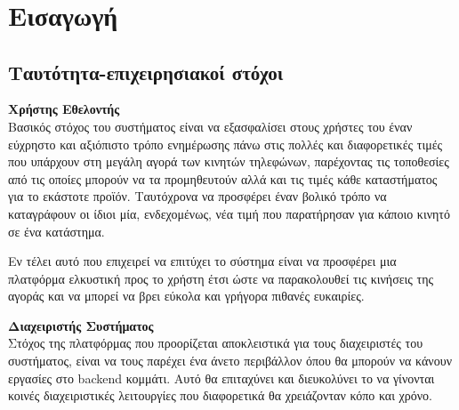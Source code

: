 \documentclass[12pt, oneside, a4paper]{report}
\begin{document}
\\
\\
\\
    \vspace{1cm}
    \vspace{1cm}

\pagestyle{plain}
\normalsize
\section{Εισαγωγή}

\subsection{Ταυτότητα-επιχειρησιακοί στόχοι}

\textbf{Χρήστης Εθελοντής}\\
\vspace{0.5cm}
\hspace{0.6cm}Βασικός στόχος του συστήματος είναι να εξασφαλίσει στους χρήστες του έναν εύχρηστο και αξιόπιστο τρόπο ενημέρωσης πάνω στις πολλές και διαφορετικές τιμές που υπάρχουν στη μεγάλη αγορά των κινητών τηλεφώνων, παρέχοντας τις τοποθεσίες από τις οποίες μπορούν να τα προμηθευτούν αλλά και τις τιμές κάθε καταστήματος για το εκάστοτε προϊόν. Ταυτόχρονα να προσφέρει έναν βολικό τρόπο να καταγράφουν οι ίδιοι μία, ενδεχομένως, νέα τιμή που παρατήρησαν για κάποιο κινητό σε ένα κατάστημα. 

\hspace{0.6cm}Εν τέλει αυτό που επιχειρεί να επιτύχει το σύστημα είναι να προσφέρει μια πλατφόρμα ελκυστική προς το χρήστη έτσι ώστε να παρακολουθεί τις κινήσεις της αγοράς και να μπορεί να βρει εύκολα και γρήγορα πιθανές ευκαιρίες.\\
\vspace{0.5cm}

\textbf{Διαχειριστής Συστήματος}\\
\vspace{0.5cm}
\hspace{0.6cm}Στόχος της πλατφόρμας που προορίζεται αποκλειστικά για τους διαχειριστές του συστήματος, είναι να τους παρέχει ένα άνετο περιβάλλον όπου θα μπορούν να κάνουν εργασίες στο backend κομμάτι. Αυτό θα επιταχύνει και διευκολύνει το να γίνονται κοινές διαχειριστικές λειτουργίες που διαφορετικά θα χρειάζονταν κόπο και χρόνο.
\end{document}
